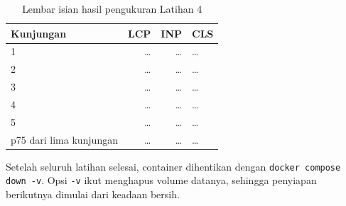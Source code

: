 \begin{table}[!htb]
  \centering
  \caption{Lembar isian hasil pengukuran Latihan 4}
  \label{tab:c5-lat4-hasil}
  \begin{tabularx}{\textwidth}{lrrX}
    \hline
    \textbf{Kunjungan} & \textbf{LCP} & \textbf{INP} & \textbf{CLS} \\
    \hline
    1 & \dots & \dots & \dots \\
    \hline
    2 & \dots & \dots & \dots \\
    \hline
    3 & \dots & \dots & \dots \\
    \hline
    4 & \dots & \dots & \dots \\
    \hline
    5 & \dots & \dots & \dots \\
    \hline
    p75 dari lima kunjungan & \dots & \dots & \dots \\
    \hline
  \end{tabularx}
\end{table}

Setelah seluruh latihan selesai, container dihentikan dengan
\texttt{docker compose down -v}. Opsi \texttt{-v} ikut menghapus volume
datanya, sehingga penyiapan berikutnya dimulai dari keadaan bersih.
